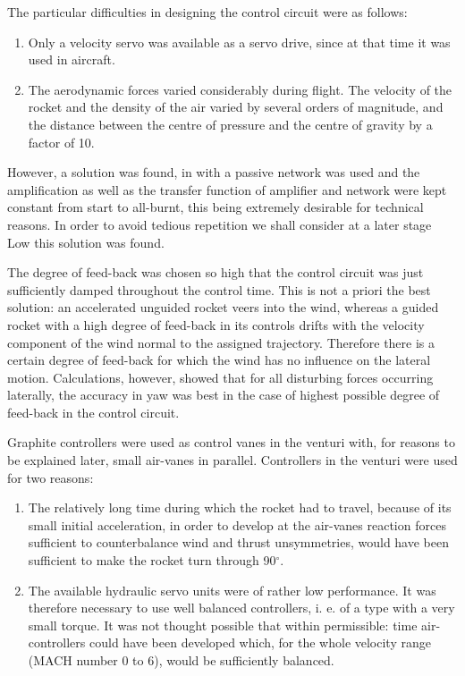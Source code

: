 \documentclass[12pt, a4paper]{article}
\begin{document}
The particular difficulties in designing the control circuit were as follows:

\begin{enumerate}
  \item Only a velocity servo was available as a servo drive, since at that time it was used in aircraft.
  \item The aerodynamic forces varied considerably during flight. The velocity of the rocket and the density of the air varied by several orders of magnitude, and the distance between the centre of pressure and the centre of gravity by a factor of 10.
\end{enumerate}

However, a solution was found, in with a passive network was used and the amplification as well as the transfer function of amplifier and network were kept constant from start to all-burnt, this being extremely desirable for technical reasons. In order to avoid tedious repetition we shall consider at a later stage Low this solution was found.

The degree of feed-back was chosen so high that the control circuit was just sufficiently damped throughout the control time. This is not a priori the best solution: an accelerated unguided rocket veers into the wind, whereas a guided rocket with a high degree of feed-back in its controls drifts with the velocity component of the wind normal to the assigned trajectory. Therefore there is a certain degree of feed-back for which the wind has no influence on the lateral motion. Calculations, however, showed that for all disturbing forces occurring laterally, the accuracy in yaw was best in the case of highest possible degree of feed-back in the control circuit.

Graphite controllers were used as control vanes in the venturi with, for reasons to be explained later, small air-vanes in parallel. Controllers in the venturi were used for two reasons:

\begin{enumerate}
  \item The relatively long time during which the rocket had to travel, because of its small initial acceleration, in order to develop at the air-vanes reaction forces sufficient to counterbalance wind and thrust unsymmetries, would have been sufficient to make the rocket turn through 90$^\circ$.
  \item The available hydraulic servo units were of rather low performance. It was therefore necessary to use well balanced controllers, i. e. of a type with a very small torque. It was not thought possible that within permissible: time air-controllers could have been developed which, for the whole velocity range (MACH number 0 to 6), would be sufficiently balanced.
\end{enumerate}
\end{document}
